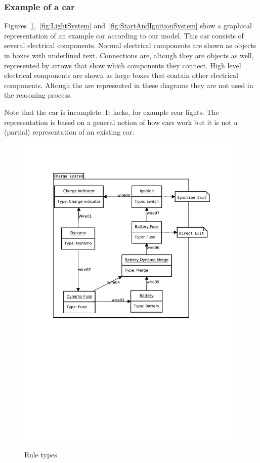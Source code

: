 \documentclass[a4paper,10pt]{article}
\begin{document}
\subsubsection{Example of a car}
Figures~\ref{fig:ChargeSystem},~\ref{fig:LightSystem} and~\ref{fig:StartAndIgnitionSystem} show a graphical representation of an example car according to our model. This car consists of several electrical components. Normal electrical components are shown as objects in boxes with underlined text. Connections are, altough they are objects as well, represented by arrows that show which components they connect. High level electrical components are shown as large boxes that contain other electrical components. Altough the are represented in these diagrams they are not used in the reasoning process.

Note that the car is incomplete. It lacks, for example rear lights. The representation is based on a general notion of how cars work but it is not a (partial) representation of an existing car.

\begin{figure}[htbp]
	\centering
		\includegraphics[width=1.00\textwidth]{ChargeSystem.pdf}
	\caption{Rule types}
	\label{fig:ChargeSystem}
\end{figure}
\end{document}
